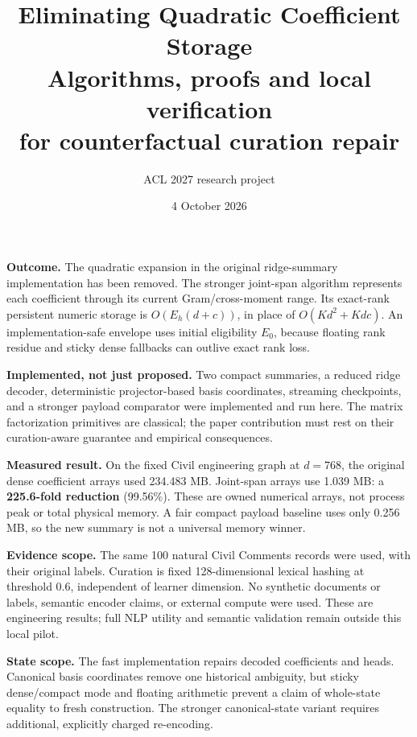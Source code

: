 \documentclass[11pt,a4paper]{article}
\title{\color{ink}\textbf{Eliminating Quadratic Coefficient Storage}\\[5pt]\Large Algorithms, proofs and local verification\\for counterfactual curation repair}
\author{ACL 2027 research project}
\date{4 October 2026}
\begin{document}
\maketitle
\textbf{Outcome.} The quadratic expansion in the original ridge-summary
implementation has been removed. The stronger joint-span algorithm represents
each coefficient through its current Gram/cross-moment range. Its exact-rank
persistent numeric storage is $O(E_h(d+c))$, in place of $O(Kd^2+Kdc)$.
An implementation-safe envelope uses initial eligibility $E_0$, because
floating rank residue and sticky dense fallbacks can outlive exact rank loss.

\textbf{Implemented, not just proposed.} Two compact summaries, a reduced
ridge decoder, deterministic projector-based basis coordinates, streaming
checkpoints, and a stronger payload comparator were implemented and run here.
The matrix factorization primitives are classical; the paper contribution
must rest on their curation-aware guarantee and empirical consequences.

\textbf{Measured result.} On the fixed Civil engineering graph at $d=768$,
the original dense coefficient arrays used 234.483 MB. Joint-span arrays use
1.039 MB: a \textbf{225.6-fold reduction} (99.56\%). These are owned numerical
arrays, not process peak or total physical memory. A fair compact payload
baseline uses only 0.256 MB, so the new summary is not a universal memory winner.

\textbf{Evidence scope.} The same 100 natural Civil Comments records were
used, with their original labels. Curation is fixed 128-dimensional lexical
hashing at threshold 0.6, independent of learner dimension. No synthetic
documents or labels, semantic encoder claims, or external compute were used.
These are engineering results; full NLP utility and semantic validation remain
outside this local pilot.

\textbf{State scope.} The fast implementation repairs decoded coefficients
and heads. Canonical basis coordinates remove one historical ambiguity,
but sticky dense/compact mode and floating arithmetic prevent a claim of
whole-state equality to fresh construction. The stronger canonical-state
variant requires additional, explicitly charged re-encoding.
\newpage
\end{document}
